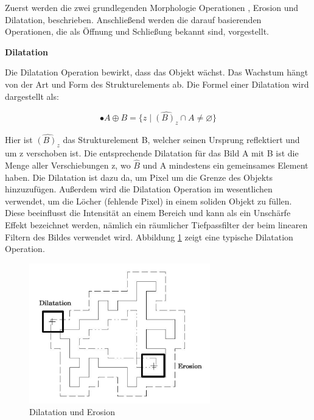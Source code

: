 Zuerst werden die zwei grundlegenden Morphologie Operationen \cite{morpho}, Erosion und Dilatation, beschrieben. Anschließend werden die darauf basierenden Operationen, die als Öffnung und Schließung bekannt sind, vorgestellt.

\textbf{Dilatation}

Die Dilatation Operation bewirkt, dass das Objekt wächst. Das Wachstum hängt von der Art und Form des Strukturelements ab. Die Formel einer Dilatation wird dargestellt als:

\begin{equation}
•A \oplus B =\lbrace z \mid \widehat{(B)_z} \cap A \ne \varnothing \rbrace  
\end{equation}

Hier ist $ \widehat{(B)_z} $ das Strukturelement B, welcher seinen Ursprung reflektiert und um z verschoben ist. Die entsprechende Dilatation für das Bild A mit B ist die Menge aller Verschiebungen z, wo $ \widehat{B} $ und A mindestens ein gemeinsames Element haben. Die Dilatation ist dazu da, um Pixel um die Grenze des Objekts hinzuzufügen. Außerdem wird die Dilatation Operation im wesentlichen verwendet, um die Löcher (fehlende Pixel) in einem soliden Objekt zu füllen. Diese beeinflusst die Intensität an einem Bereich und kann als ein Unschärfe Effekt bezeichnet werden, nämlich ein räumlicher Tiefpassfilter der beim linearen Filtern des Bildes verwendet wird. Abbildung \ref{fig:Dilatation und Erosion} zeigt eine typische Dilatation Operation.

\begin{figure}[H]
 \centering 
  \includegraphics[keepaspectratio,width=0.7\textwidth]{images/4_ZweiteErfahrung/Morphological/DilatationundErosion.pdf}
 \caption{Dilatation und Erosion}
 \label{fig:Dilatation und Erosion}
\end{figure} 


